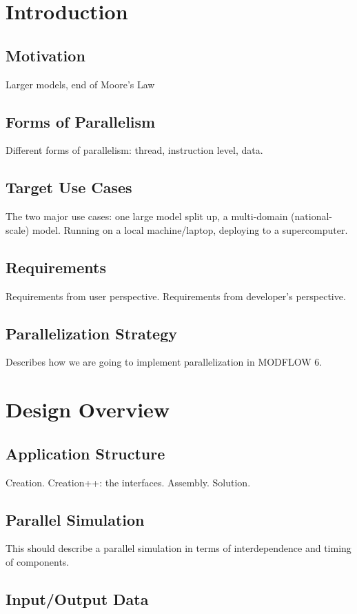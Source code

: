 \chapter{Introduction}

\section{Motivation}
Larger models, end of Moore's Law

\section{Forms of Parallelism}
Different forms of parallelism: thread, instruction level, data.

\section{Target Use Cases}
The two major use cases: one large model split up, a multi-domain (national-scale) model. Running on a local machine/laptop, deploying to a supercomputer.

\section{Requirements}
Requirements from user perspective. Requirements from developer's perspective.

\section{Parallelization Strategy}
Describes how we are going to implement parallelization in MODFLOW 6.

\chapter{Design Overview}

\section{Application Structure}
Creation. Creation++: the interfaces. Assembly. Solution.
\section{Parallel Simulation}
This should describe a parallel simulation in terms of interdependence and timing of components.
\section{Input/Output Data}


